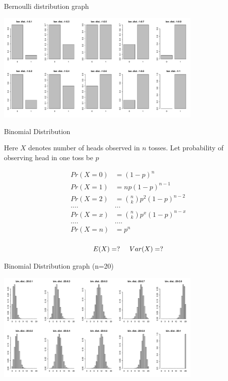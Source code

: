 \documentclass{beamer}\usepackage[]{graphicx}\usepackage[]{color}
\begin{document}
\begin{frame}[fragile]{Bernoulli distribution graph \;\;}


\includegraphics[width=10cm,keepaspectratio]{bernoulli_plots.pdf}

\end{frame}

\begin{frame}[fragile]{Binomial Distribution \;\;}

Here $X$ denotes number of heads observed in $n$ tosses. Let probability of observing head in one toss be $p$

\begin{align}
Pr(X=0) & = (1-p)^{n} \\
Pr(X=1) & = np(1-p)^{n-1} \\
Pr(X=2) & = {n \choose k} p^2 (1-p)^{n-2} \\
....  &  ...  \\
Pr(X=x) & = {n \choose k} p^x (1-p)^{n-x}  \\
.... &  .... \\
Pr(X=n) & = p^{n} \\
\end{align}

$$ E(X) = ?  \hspace{0.5 cm} Var(X) = ?  $$

\end{frame}

\begin{frame}[fragile]{Binomial Distribution graph (n=20) \;\;}


\includegraphics[width=10cm,keepaspectratio]{binomial_plots.pdf}
\end{frame}
\end{document}
